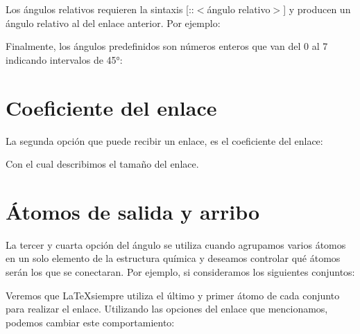 \documentclass[12pt,letterpaper]{article}
\begin{document}
\begin{center}
\end{center}

Los ángulos relativos requieren la sintaxis  [::$ < $ángulo relativo$ > $] y producen un ángulo relativo al del enlace anterior. Por ejemplo:

\begin{center}
\end{center}

Finalmente, los ángulos predefinidos son números enteros que van del 0 al 7 indicando intervalos de 45°:

\begin{center}

\end{center}

\section{Coeficiente del enlace}

La segunda opción que puede recibir un enlace, es el coeficiente del enlace:

\begin{center}
\end{center}

Con el cual describimos el tamaño del enlace.

\section{Átomos de salida y arribo }

La tercer y cuarta opción del ángulo se utiliza cuando agrupamos varios átomos en un solo elemento de la estructura química y deseamos controlar qué átomos serán los que se conectaran. Por ejemplo, si consideramos los siguientes conjuntos:

\begin{flushleft}
\quad
{}\quad
{}
\end{flushleft}

Veremos que \LaTeX siempre utiliza el último y primer átomo de cada conjunto para realizar el enlace. Utilizando las opciones del enlace que mencionamos, podemos cambiar este comportamiento:

\begin{flushleft}
\qquad
{}\qquad
{}
\end{flushleft}
\end{document}
